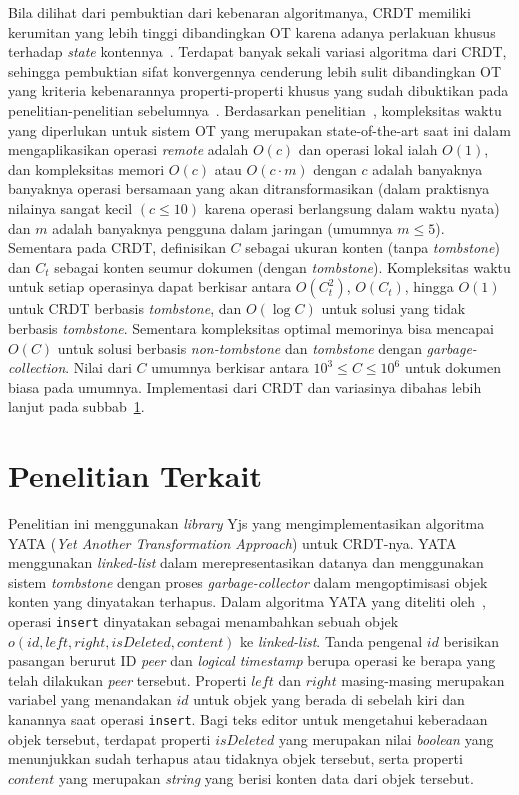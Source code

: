 Bila dilihat dari pembuktian dari kebenaran algoritmanya, CRDT memiliki kerumitan yang lebih tinggi dibandingkan OT karena adanya perlakuan khusus terhadap \textit{state} kontennya~\citep{Sun2019Second}. Terdapat banyak sekali variasi algoritma dari CRDT, sehingga pembuktian sifat konvergennya cenderung lebih sulit dibandingkan OT yang kriteria kebenarannya properti-properti khusus yang sudah dibuktikan pada penelitian-penelitian sebelumnya~\citep{OTOverview1, Sun2004, oster2005real}. Berdasarkan penelitian~\cite{Sun2019Second}, kompleksitas waktu yang diperlukan untuk sistem OT yang merupakan {state-of-the-art} saat ini dalam mengaplikasikan operasi \textit{remote} adalah $O(c)$ dan operasi lokal ialah $O(1)$, dan kompleksitas memori $O(c)$ atau $O(c \cdot m)$ dengan $c$ adalah banyaknya banyaknya operasi bersamaan yang akan ditransformasikan (dalam praktisnya nilainya sangat kecil $(c \leq 10)$ karena operasi berlangsung dalam waktu nyata) dan $m$ adalah banyaknya pengguna dalam jaringan (umumnya $m \leq 5$). Sementara pada CRDT, definisikan $C$ sebagai ukuran konten (tanpa \textit{tombstone}) dan $C_t$ sebagai konten seumur dokumen (dengan \textit{tombstone}). Kompleksitas waktu untuk setiap operasinya dapat berkisar antara $O(C_{t}^{2})$, $O(C_{t})$, hingga $O(1)$ untuk CRDT berbasis \textit{tombstone}, dan $O(\log C)$ untuk solusi yang tidak berbasis \textit{tombstone}. Sementara kompleksitas optimal memorinya bisa mencapai $O(C)$ untuk solusi berbasis \textit{non-tombstone} dan \textit{tombstone} dengan \textit{garbage-collection}. Nilai dari $C$ umumnya berkisar antara $10^3 \leq C \leq 10^6$ untuk dokumen biasa pada umumnya. Implementasi dari CRDT dan variasinya dibahas lebih lanjut pada subbab~\ref{sec:penelitian_terkait}.

\section{Penelitian Terkait}
\label{sec:penelitian_terkait}

Penelitian ini menggunakan \textit{library} Yjs yang mengimplementasikan algoritma YATA (\textit{Yet Another Transformation Approach}) untuk CRDT-nya. YATA menggunakan \textit{linked-list} dalam merepresentasikan datanya dan menggunakan sistem \textit{tombstone} dengan proses \textit{garbage-collector} dalam mengoptimisasi objek konten yang dinyatakan terhapus. Dalam algoritma YATA yang diteliti oleh~\cite{Nicolaescu2016yjs}, operasi \texttt{insert} dinyatakan sebagai menambahkan sebuah objek $o(id, left, right, isDeleted, content)$ ke \textit{linked-list}. Tanda pengenal $id$ berisikan pasangan berurut ID \textit{peer} dan \textit{logical timestamp} berupa operasi ke berapa yang telah dilakukan \textit{peer} tersebut. Properti $left$ dan $right$ masing-masing merupakan variabel yang menandakan $id$ untuk objek yang berada di sebelah kiri dan kanannya saat operasi \texttt{insert}. Bagi teks editor untuk mengetahui keberadaan objek tersebut, terdapat properti $isDeleted$ yang merupakan nilai \textit{boolean} yang menunjukkan sudah terhapus atau tidaknya objek tersebut, serta properti $content$ yang merupakan \textit{string} yang berisi konten data dari objek tersebut.

